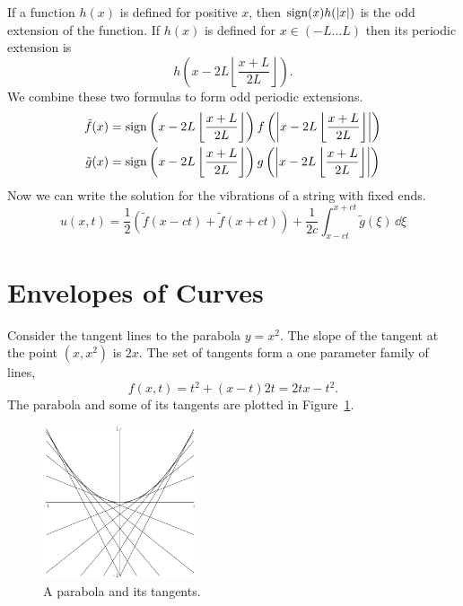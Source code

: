 If a function $h(x)$ is defined for positive $x$, then $\mathop{\mathrm{sign}}\nolimits(x) h(|x|)$ is 
the odd extension of the function.  If $h(x)$ is defined for $x \in (-L \ldots L)$ 
then its periodic extension is 
\[
h \left( x - 2 L \left\lfloor \frac{x+L}{2L} \right\rfloor \right).
\]
We combine these two formulas to form odd periodic extensions.
\begin{gather*}
  \tilde{f}(x) = 
  \mathop{\mathrm{sign}}\nolimits \left( x - 2 L \left\lfloor \frac{x+L}{2L} \right\rfloor \right)
  f \left( \left| x - 2 L \left\lfloor \frac{x+L}{2L} \right\rfloor \right| \right)
  \\
  \tilde{g}(x) = 
  \mathop{\mathrm{sign}}\nolimits \left( x - 2 L \left\lfloor \frac{x+L}{2L} \right\rfloor \right)
  g \left( \left| x - 2 L \left\lfloor \frac{x+L}{2L} \right\rfloor \right| \right)
\end{gather*}
Now we can write the solution for the vibrations of a string with fixed ends.
\[
u(x,t) = \frac{1}{2} \left( \tilde{f}(x - c t) + \tilde{f}(x + c t) \right)
+ \frac{1}{2c} \int_{x - c t}^{x + c t} \tilde{g}(\xi) \,\dd \xi
\]








\section{Envelopes of Curves}






Consider the tangent lines to the parabola $y=x^2$.  The slope of the tangent
at the point $(x,x^2)$ is $2x$.  The set of tangents form a one
parameter family of lines,
\[
f(x,t) = t^2 + (x-t)2t = 2 t x - t^2.
\]
The parabola and some of its tangents are plotted in Figure~\ref{partan}.


\begin{figure}[h!]
  \begin{center}
    \includegraphics[width=0.4\textwidth]{pde/characteristics/partan}
  \end{center}
  \caption{A parabola and its tangents.}
  \label{partan}
\end{figure}

